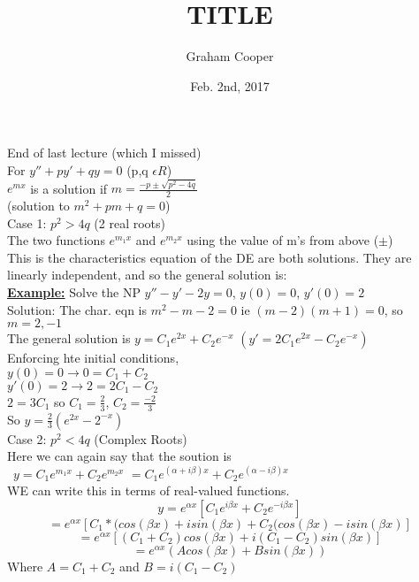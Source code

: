 \documentclass[12pt]{article}
\title{\vspace{-15ex}TITLE\vspace{-1ex}}
\date{Feb. 2nd, 2017}
\author{Graham Cooper}
\newcommand{\myt}[1]{\textbf{\underline{#1}}}
\begin{document}
	\maketitle
	
	End of last lecture (which I missed) \\
	
	For $y'' + py' + qy = 0$ (p,q $\epsilon R$)\\
	$e^{mx}$ is a solution if $m = \frac{-p \pm \sqrt{p^2 - 4q}}{2}$\\
	(solution to $m^2 + pm + q = 0$)\\
	Case 1: $p^2 > 4q$ (2 real roots)\\
	
	The two functions $e^{m_1x}$ and $e^{m_2x}$ using the value of m's from above ($\pm$)\\
	This is the characteristics equation of the DE are both solutions. They are linearly independent, and so the general solution is:\\

	\myt{Example:} Solve the NP $y'' - y' - 2y = 0$, $y(0) = 0$, $y'(0) = 2$\\
	Solution: The char. eqn is $m^2 - m - 2 = 0$ ie $(m-2)(m+1) = 0$, so $m = 2, -1$\\
	
	The general solution is $y = C_1e^{2x}+C_2e^{-x}$ $(y' = 2C_1e^{2x}-C_2e^{-x})$\\
	Enforcing hte initial conditions,\\
	$y(0) = 0 \rightarrow 0 = C_1 + C_2$\\
	$y'(0) = 2 \rightarrow 2 = 2C_1 - C_2$\\
	$2 = 3C_1$ so $C_1 = \frac{2}{3}$, $C_2 = \frac{-2}{3}$\\
	So $y = \frac{2}{3}(e^{2x}-2^{-x})$\\
	
	Case 2: $p^2 < 4q$ (Complex Roots)\\
	Here we can again say that the soution is\\\
	$y = C_1e^{m_1x} + C_2e^{m_2x}$
	$= C_1e^{(\alpha + i\beta)x} + C_2e^{(\alpha - i\beta)x}$\\
	WE can write this in terms of real-valued functions.\\
	$$y = e^{\alpha x}[C_1e^{i\beta x} + C_2e^{-i\beta x}]$$
	$$= e^{\alpha x}[C_1*(cos(\beta x) + isin(\beta x) + C_2(cos(\beta x) - isin(\beta x)]$$
	$$= e^{\alpha x}[(C_1 + C_2)cos(\beta x) + i(C_1 - C_2)sin(\beta x)]$$
	$$= e^{\alpha x}(Acos(\beta x) + Bsin(\beta x))$$
	Where $A = C_1 + C_2$ and $B = i(C_1 - C_2)$\\
	
\end{document}

